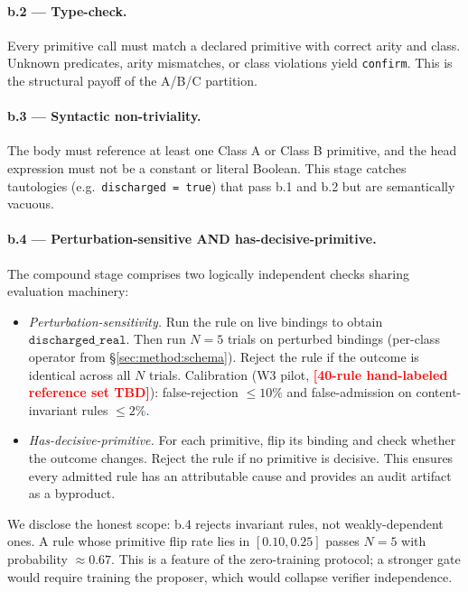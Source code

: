 \documentclass{article}
\theoremstyle{definition}
\newcommand{\placeholder}[1]{\textcolor{red}{\textbf{[#1]}}}
\begin{document}
\paragraph{b.2 --- Type-check.}
Every primitive call must match a declared primitive with correct
arity and class. Unknown predicates, arity mismatches, or class
violations yield \texttt{confirm}. This is the structural payoff of
the A/B/C partition.

\paragraph{b.3 --- Syntactic non-triviality.}
The body must reference at least one Class A or Class B primitive,
and the head expression must not be a constant or literal Boolean.
This stage catches tautologies (e.g.\ \texttt{discharged = true})
that pass b.1 and b.2 but are semantically vacuous.

\paragraph{b.4 --- Perturbation-sensitive AND has-decisive-primitive.}
The compound stage comprises two logically independent checks sharing
evaluation machinery:
\begin{itemize}[leftmargin=1.5em]
\item \emph{Perturbation-sensitivity.} Run the rule on live bindings
to obtain $\mathtt{discharged\_real}$. Then run $N{=}5$ trials on
perturbed bindings (per-class operator from
\S\ref{sec:method:schema}). Reject the rule if the outcome is
identical across all $N$ trials. Calibration (W3 pilot,
\placeholder{40-rule hand-labeled reference set TBD}): false-rejection
$\le 10\%$ and false-admission on content-invariant rules $\le 2\%$.
\item \emph{Has-decisive-primitive.} For each primitive, flip its
binding and check whether the outcome changes. Reject the rule if no
primitive is decisive. This ensures every admitted rule has an
attributable cause and provides an audit artifact as a byproduct.
\end{itemize}
We disclose the honest scope: b.4 rejects invariant rules, not
weakly-dependent ones. A rule whose primitive flip rate lies in
$[0.10, 0.25]$ passes $N{=}5$ with probability $\approx 0.67$. This is
a feature of the zero-training protocol; a stronger gate would
require training the proposer, which would collapse verifier
independence.
\end{document}
